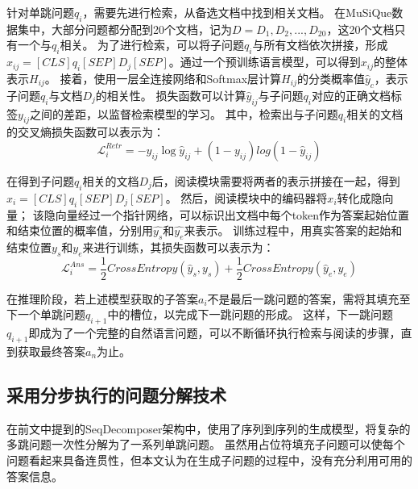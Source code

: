 针对单跳问题$q_i$，需要先进行检索，从备选文档中找到相关文档。
在MuSiQue数据集中，大部分问题都分配到20个文档，记为$D={D_1, D_2, ..., D_20}$，这20个文档只有一个与$q_i$相关。
为了进行检索，可以将子问题$q_i$与所有文档依次拼接，形成$x_{ij}=[CLS]q_i[SEP]D_j[SEP]$。通过一个预训练语言模型，可以得到$x_{ij}$的整体表示$H_{ij}$。
接着，使用一层全连接网络和Softmax层计算$H_{ij}$的分类概率值$\hat y_c$，表示子问题$q_i$与文档$D_j$的相关性。
损失函数可以计算$\hat y_{ij}$与子问题$q_i$对应的正确文档标签$y_{ij}$之间的差距，以监督检索模型的学习。
其中，检索出与子问题$q_i$相关的文档的交叉熵损失函数可以表示为：
\begin{equation}
    \mathcal  L^{Retr}_{i}  = -y_{ij}\log\hat y_{ij}+(1-y_{ij})log(1-\hat y_{ij})
\end{equation}

在得到子问题$q_i$相关的文档$D_j$后，阅读模块需要将两者的表示拼接在一起，得到$x_i=[CLS]q_i[SEP]D_j[SEP]$。
然后，阅读模块中的编码器将$x_i$转化成隐向量；
该隐向量经过一个指针网络，可以标识出文档中每个token作为答案起始位置和结束位置的概率值，分别用$\hat{y_s}$和$\hat{y_e}$来表示。
训练过程中，用真实答案的起始和结束位置$y_s$和$y_e$来进行训练，其损失函数可以表示为：
\begin{equation}
    \mathcal L^{Ans}_{i} = \frac{1}{2} CrossEntropy(\hat y_s,y_s) + \frac{1}{2} CrossEntropy(\hat y_e,y_e)
\end{equation}

在推理阶段，若上述模型获取的子答案$a_i$不是最后一跳问题的答案，需将其填充至下一个单跳问题$q_{i+1}$中的槽位，以完成下一跳问题的形成。
这样，下一跳问题$q_{i+1}$即成为了一个完整的自然语言问题，可以不断循环执行检索与阅读的步骤，直到获取最终答案$a_n$为止。

\subsection{采用分步执行的问题分解技术}
在前文中提到的SeqDecomposer架构中，使用了序列到序列的生成模型，将复杂的多跳问题一次性分解为了一系列单跳问题。
虽然用占位符填充子问题可以使每个问题看起来具备连贯性，但本文认为在生成子问题的过程中，没有充分利用可用的答案信息。

